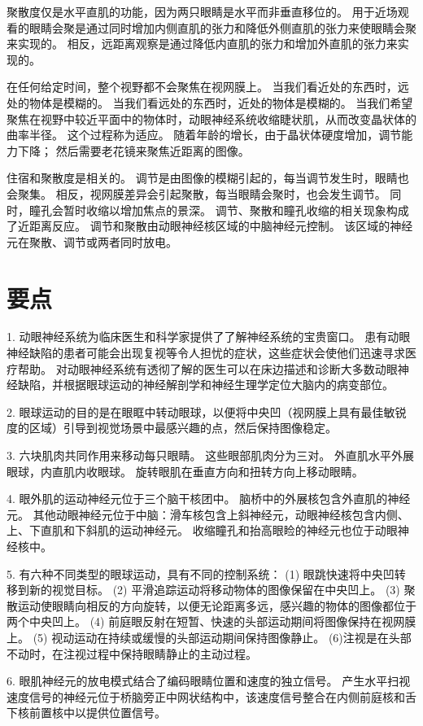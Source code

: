 聚散度仅是水平直肌的功能，因为两只眼睛是水平而非垂直移位的。 用于近场观看的眼睛会聚是通过同时增加内侧直肌的张力和降低外侧直肌的张力来使眼睛会聚来实现的。 相反，远距离观察是通过降低内直肌的张力和增加外直肌的张力来实现的。

在任何给定时间，整个视野都不会聚焦在视网膜上。 当我们看近处的东西时，远处的物体是模糊的。 当我们看远处的东西时，近处的物体是模糊的。 当我们希望聚焦在视野中较近平面中的物体时，动眼神经系统收缩睫状肌，从而改变晶状体的曲率半径。 这个过程称为适应。 随着年龄的增长，由于晶状体硬度增加，调节能力下降； 然后需要老花镜来聚焦近距离的图像。

住宿和聚散度是相关的。 调节是由图像的模糊引起的，每当调节发生时，眼睛也会聚集。 相反，视网膜差异会引起聚散，每当眼睛会聚时，也会发生调节。 同时，瞳孔会暂时收缩以增加焦点的景深。 调节、聚散和瞳孔收缩的相关现象构成了近距离反应。 调节和聚散由动眼神经核区域的中脑神经元控制。 该区域的神经元在聚散、调节或两者同时放电。



\section{要点}
1. 动眼神经系统为临床医生和科学家提供了了解神经系统的宝贵窗口。 患有动眼神经缺陷的患者可能会出现复视等令人担忧的症状，这些症状会使他们迅速寻求医疗帮助。 对动眼神经系统有透彻了解的医生可以在床边描述和诊断大多数动眼神经缺陷，并根据眼球运动的神经解剖学和神经生理学定位大脑内的病变部位。

2. 眼球运动的目的是在眼眶中转动眼球，以便将中央凹（视网膜上具有最佳敏锐度的区域）引导到视觉场景中最感兴趣的点，然后保持图像稳定。

3. 六块肌肉共同作用来移动每只眼睛。 这些眼部肌肉分为三对。 外直肌水平外展眼球，内直肌内收眼球。 旋转眼肌在垂直方向和扭转方向上移动眼睛。

4. 眼外肌的运动神经元位于三个脑干核团中。 脑桥中的外展核包含外直肌的神经元。 其他动眼神经元位于中脑：滑车核包含上斜神经元，动眼神经核包含内侧、上、下直肌和下斜肌的运动神经元。 收缩瞳孔和抬高眼睑的神经元也位于动眼神经核中。

5. 有六种不同类型的眼球运动，具有不同的控制系统： (1) 眼跳快速将中央凹转移到新的视觉目标。 (2) 平滑追踪运动将移动物体的图像保留在中央凹上。 (3) 聚散运动使眼睛向相反的方向旋转，以便无论距离多远，感兴趣的物体的图像都位于两个中央凹上。 (4) 前庭眼反射在短暂、快速的头部运动期间将图像保持在视网膜上。 (5) 视动运动在持续或缓慢的头部运动期间保持图像静止。 (6)注视是在头部不动时，在注视过程中保持眼睛静止的主动过程。

6. 眼肌神经元的放电模式结合了编码眼睛位置和速度的独立信号。 产生水平扫视速度信号的神经元位于桥脑旁正中网状结构中，该速度信号整合在内侧前庭核和舌下核前置核中以提供位置信号。

